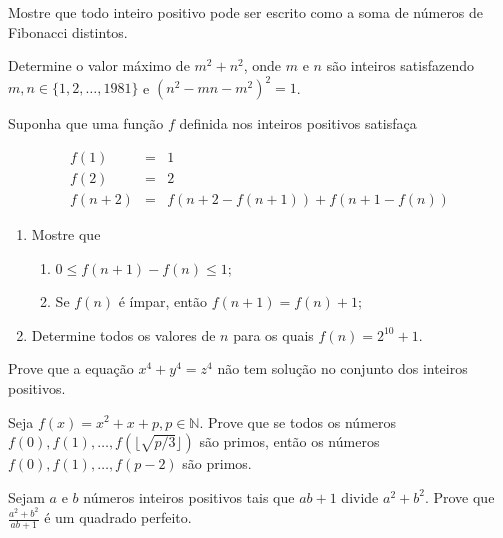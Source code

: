 \begin{questao}
  Mostre que todo inteiro positivo pode ser escrito como a soma de números de
  Fibonacci distintos.
\end{questao}

\begin{questao}
  Determine o valor máximo de $m^2+n^2$, onde $m$ e $n$ são inteiros
  satisfazendo $m,n \in \{1,2,\ldots,1981\}$ e $(n^2-mn-m^2)^2 = 1$.
\end{questao}

\begin{questao}
  Suponha que uma função $f$ definida nos inteiros positivos satisfaça

  \begin{eqnarray*}
    f(1) & = & 1 \\
    f(2) & = & 2 \\
    f(n+2) & = & f(n+2-f(n+1)) + f(n+1-f(n))
  \end{eqnarray*}

  \begin{enumerate}

  \item Mostre que
    \begin{enumerate}

    \item $0 \leq f(n+1) - f(n) \leq 1$;

    \item Se $f(n)$ é ímpar, então $f(n+1) = f(n) + 1$;
    \end{enumerate}

  \item Determine todos os valores de $n$ para os quais $f(n) = 2^{10}+1$.
  \end{enumerate}
\end{questao}

\begin{questao}
  Prove que a equação $x^4+y^4=z^4$ não tem solução no conjunto dos inteiros
  positivos.
\end{questao}

\begin{questao}
  Seja $f(x)=x^2+x+p, p \in \mathbb{N}$. Prove que se todos os números $f(0),
  f(1), \ldots,f(\lfloor \sqrt{p/3} \rfloor)$ são primos, então os números
  $f(0),f(1), \ldots,f(p-2)$ são primos.
\end{questao}

\begin{questao}
  Sejam $a$ e $b$ números inteiros positivos tais que $ab+1$ divide
  $a^2+b^2$. Prove que $\frac{a^2+b^2}{ab+1}$ é um quadrado perfeito.
\end{questao}

